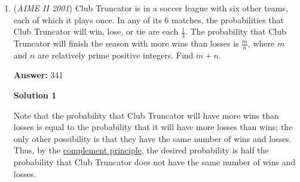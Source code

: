 \begin{enumerate}
 So, this pattern repeats every 6. 

 Also, $10^j-10^i \equiv 0 \pmod{1001}$, so$10^j \equiv 10^i \pmod{1001}$, and thus, 
 \[j \equiv i \pmod{6}\]. Continue with the 2nd paragraph of solution 1, and we get the answer of $\boxed{784}$.

 -AlexLikeMath

 



\textbf{Solution 3}

Note that $1001=7\cdot 11\cdot 13,$ and note that $10^6 \equiv 1 \pmod{p}$ for prime $p \mid 1001$; therefore, the order of 10 modulo $7,11$, and $13$ must divide 6. A quick check on 7 reveals that it is indeed 6. Therefore we note that $i-j=6k$ for some natural number k. From here, we note that for $j=0,1,2,3,$ we have 16 options and we have 15,14,...,1 option(s) for the next 90 numbers (6 each), so our total is $4\cdot 16 + 6 \cdot \frac{15 \cdot 16}{2} = \boxed{784}$.

 



\textbf{Solution 4}

$10^j - 10^i \equiv 0 \pmod{1001} \iff 10^{j - i} - 1 \equiv 0 \pmod{1001} \iff 10^{j - i} \equiv 1 \pmod{1001} \iff j \equiv i \pmod 6$, by the same argument as in all the solutions above. If $j \equiv i \equiv n \pmod 6$ for $n = 0, 1, 2, 3$, there are $17$ choices for each value of $n$, yielding $4 \cdot \dbinom{17}{2} = 544$. However, if $n = 4, 5$, there are only $16$ choices, giving us $2 \cdot \dbinom{16}{2} = 240$. So, our final answer is $544 + 240 = \boxed{784}$.~Puck\_0

 


	\item (\textit{AIME II 2001}) Club Truncator is in a soccer league with six other teams, each of which it plays once. In any of its 6 matches, the probabilities that Club Truncator will win, lose, or tie are each $\frac {1}{3}$. The probability that Club Truncator will finish the season with more wins than losses is $\frac {m}{n}$, where $m$ and $n$ are relatively prime positive integers. Find $m + n$.


 
 \textbf{Answer: }341



\textbf{Solution 1}

Note that the probability that Club Truncator will have more wins than losses is equal to the probability that it will have more losses than wins; the only other possibility is that they have the same number of wins and losses. Thus, by the \href{https://artofproblemsolving.com/wiki/index.php?title=Complement\_principle}{complement principle}, the desired probability is half the probability that Club Truncator does not have the same number of wins and losses.


\end{enumerate}
